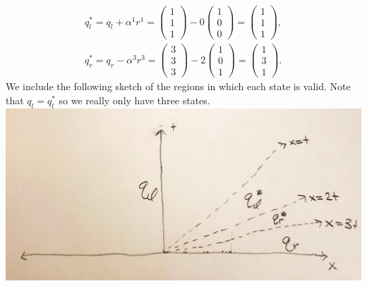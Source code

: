 \documentclass{article}
\begin{document}
\begin{align*}
q_{l}^*=q_l+\alpha^1r^1=\begin{pmatrix}
	1\\1\\1
\end{pmatrix}-0\begin{pmatrix}
1\\0\\0
\end{pmatrix}=\begin{pmatrix}
1\\1\\1
\end{pmatrix},\\
q_r^*=q_r-\alpha^3r^3=\begin{pmatrix}
	3\\3\\3
\end{pmatrix}-2\begin{pmatrix}
1\\0\\1
\end{pmatrix}=\begin{pmatrix}
1\\3\\1
\end{pmatrix}.
\end{align*}
We include the following sketch of the regions in which each state is valid. Note that $q_l=q_l^*$ so we really only have three states.\\
\includegraphics[scale=0.5]{574hw1figs-2.pdf}
\end{document}
